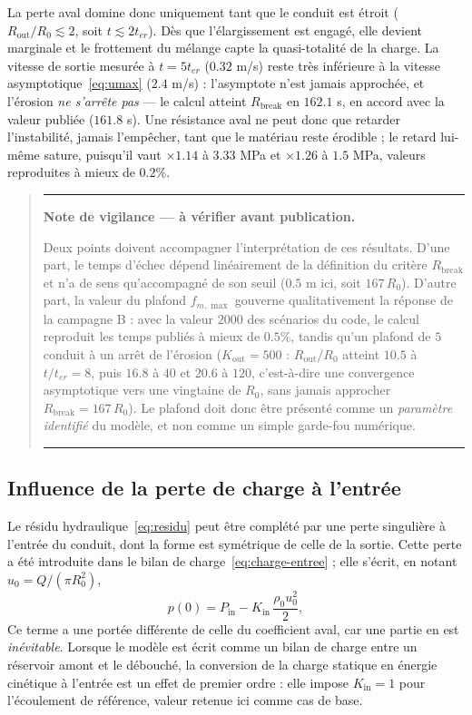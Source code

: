 \documentclass[11pt,a4paper]{report}
\newcommand{\kout}{K_{\mathrm{out}}}
\newcommand{\kin}{K_{\mathrm{in}}}
\newcommand{\ter}{{t_{er}}}
\newenvironment{vigilance}{%
  \begin{quote}\small\noindent\rule{\linewidth}{0.4pt}\par\vspace{3pt}%
  \textbf{Note de vigilance --- \`a v\'erifier avant publication.}\par\vspace{2pt}}%
  {\par\vspace{3pt}\noindent\rule{\linewidth}{0.4pt}\end{quote}}
\begin{document}
La perte aval domine donc uniquement tant que le conduit est étroit (\(R_{\mathrm{out}}/R_0 \lesssim 2\),
soit \(t \lesssim 2\ter\)). Dès que l'élargissement est engagé, elle devient marginale et le frottement du
mélange capte la quasi-totalité de la charge. La vitesse de sortie mesurée à \(t = 5\ter\) (\(0.32\) m/s)
reste très inférieure à la vitesse asymptotique~\eqref{eq:umax} (\(2.4\) m/s) : l'asymptote n'est jamais
approchée, et l'érosion \emph{ne s'arrête pas} — le calcul atteint \(R_{\mathrm{break}}\) en \(162.1\) s, en
accord avec la valeur publiée (\(161.8\) s). Une résistance aval ne peut donc que retarder l'instabilité,
jamais l'empêcher, tant que le matériau reste érodible ; le retard lui-même sature, puisqu'il vaut
\(\times1.14\) à \(3.33\) MPa et \(\times1.26\) à \(1.5\) MPa, valeurs reproduites à mieux de \(0.2\%\).

\begin{vigilance}
Deux points doivent accompagner l'interprétation de ces résultats. D'une part, le temps d'échec dépend
linéairement de la définition du critère \(R_{\mathrm{break}}\) et n'a de sens qu'accompagné de son seuil
(\(0.5\) m ici, soit \(167\,R_0\)). D'autre part, la valeur du plafond \(f_{m,\max}\) gouverne
qualitativement la réponse de la campagne B : avec la valeur \(2000\) des scénarios du code, le calcul
reproduit les temps publiés à mieux de \(0.5\%\), tandis qu'un plafond de \(5\) conduit à un arrêt de
l'érosion (\(\kout = 500\) : \(R_{\mathrm{out}}/R_0\) atteint \(10.5\) à
\(t/\ter = 8\), puis \(16.8\) à \(40\) et \(20.6\) à \(120\), c'est-à-dire une convergence
asymptotique vers une vingtaine de \(R_0\), sans jamais approcher
\(R_{\mathrm{break}} = 167\,R_0\)). Le plafond doit donc être
présenté comme un \emph{paramètre identifié} du modèle, et non comme un simple garde-fou numérique.
\end{vigilance}

\subsection{Influence de la perte de charge à l'entrée}
\label{sec:kin}

Le résidu hydraulique~\eqref{eq:residu} peut être complété par une perte singulière à l'entrée du
conduit, dont la forme est symétrique de celle de la sortie. Cette perte a été introduite dans le bilan de
charge~\eqref{eq:charge-entree} ; elle s'écrit, en notant \(u_0 = Q/(\pi R_0^2)\),
\begin{equation}
p(0) = P_{\mathrm{in}} - \kin\,\frac{\rho_0 u_0^2}{2},
\label{eq:cond-entree}
\end{equation}
Ce terme a une portée différente de celle du coefficient aval, car une partie en est \emph{inévitable}.
Lorsque le modèle est écrit comme un bilan de charge entre un réservoir amont et le débouché, la
conversion de la charge statique en énergie cinétique à l'entrée est un effet de premier ordre : elle
impose \(\kin = 1\) pour l'écoulement de référence, valeur retenue ici comme cas de base.
\end{document}
